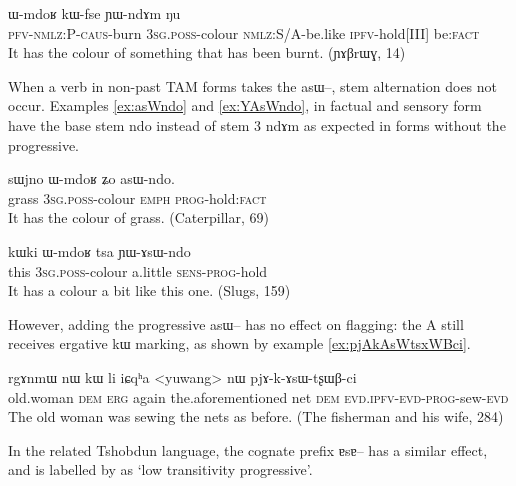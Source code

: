 \documentclass[oldfontcommands,oneside,a4paper,11pt]{article}
\newcommand{\ipa}[1]{{\phon \mbox{#1}}} %
\newcommand{\factual}[1]{\textsc{:fact}}
\begin{document}
\begin{exe}
\ex \label{ex:YWndAm}
\gll \ipa{kɤ-kɤ-sɯ-ɕke} 	\ipa{ɯ-mdoʁ} 	\ipa{kɯ-fse} 	\ipa{ɲɯ-ndɤm} 		\ipa{ŋu} \\
\textsc{pfv-nmlz:P-caus}-burn \textsc{3sg.poss}-colour \textsc{nmlz:S/A}-be.like \textsc{ipfv}-hold[III] be\factual{} \\
\glt  It has the colour of something that has been burnt. (\ipa{ɲɤβrɯɣ}, 14)
\end{exe}

When a verb in non-past TAM forms takes the \ipa{asɯ--}, stem alternation does not occur. Examples \ref{ex:asWndo} and \ref{ex:YAsWndo}, in factual and sensory form have the base stem \ipa{ndo} instead of stem 3 \ipa{ndɤm} as expected in forms without the progressive.


\begin{exe}
\ex \label{ex:asWndo}
\gll
\ipa{sɯjno} 	\ipa{ɯ-mdoʁ} 	\ipa{ʑo} 	\ipa{asɯ-ndo.} \\
grass \textsc{3sg.poss}-colour \textsc{emph} \textsc{prog}-hold\factual{} \\
\glt It has the colour of grass. (Caterpillar, 69)
\end{exe}


\begin{exe}
\ex \label{ex:YAsWndo}
\gll
\ipa{kɯki} 	\ipa{ɯ-mdoʁ} 	\ipa{tsa} 	\ipa{ɲɯ-ɤsɯ-ndo} \\
this  \textsc{3sg.poss}-colour  a.little \textsc{sens-prog}-hold \\
\glt It has a colour a bit like this one. (Slugs, 159)
\end{exe}

However, adding the progressive \ipa{asɯ--} has no effect on flagging: the A still receives ergative \ipa{kɯ} marking, as shown by example \ref{ex:pjAkAsWtsxWBci}.

\begin{exe}
\ex \label{ex:pjAkAsWtsxWBci}
\gll
\ipa{rgɤnmɯ}  	\ipa{nɯ}  	\ipa{kɯ}  	\ipa{li}  	\ipa{iɕqʰa}  	<yuwang>	\ipa{nɯ}  	\ipa{pjɤ-k-ɤsɯ-tʂɯβ-ci}  		\\
old.woman \textsc{dem} \textsc{erg} again the.aforementioned net \textsc{dem} \textsc{evd.ipfv-evd-prog}-sew-\textsc{evd} \\
\glt The old woman was sewing the nets as before. (The fisherman and his wife, 284)
\end{exe}


In the related Tshobdun language, the cognate prefix \ipa{ɐsɐ--} has a similar effect, and is labelled by \citet{jackson03caodeng} as `low transitivity progressive'.
\end{document}
